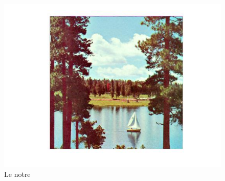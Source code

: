 \documentclass{article}
\begin{document}
\begin{figure}[h]
\begin{minipage}{0.33\textwidth}
\includegraphics[width=1\textwidth]{images/sail_conc_tmr.jpg}
\caption{Le notre}
\end{minipage}
\end{figure}
\end{document}
